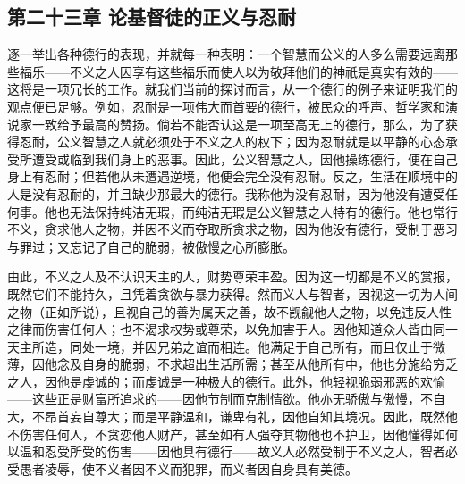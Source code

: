 \subsection{第二十三章 论基督徒的正义与忍耐}

逐一举出各种德行的表现，并就每一种表明：一个智慧而公义的人多么需要远离那些福乐——不义之人因享有这些福乐而使人以为敬拜他们的神祇是真实有效的——这将是一项冗长的工作。就我们当前的探讨而言，从一个德行的例子来证明我们的观点便已足够。例如，忍耐是一项伟大而首要的德行，被民众的呼声、哲学家和演说家一致给予最高的赞扬。倘若不能否认这是一项至高无上的德行，那么，为了获得忍耐，公义智慧之人就必须处于不义之人的权下；因为忍耐就是以平静的心态承受所遭受或临到我们身上的恶事。因此，公义智慧之人，因他操练德行，便在自己身上有忍耐；但若他从未遭遇逆境，他便会完全没有忍耐。反之，生活在顺境中的人是没有忍耐的，并且缺少那最大的德行。我称他为没有忍耐，因为他没有遭受任何事。他也无法保持纯洁无瑕，而纯洁无瑕是公义智慧之人特有的德行。他也常行不义，贪求他人之物，并因不义而夺取所贪求之物，因为他没有德行，受制于恶习与罪过；又忘记了自己的脆弱，被傲慢之心所膨胀。\par

由此，不义之人及不认识天主的人，财势尊荣丰盈。因为这一切都是不义的赏报，既然它们不能持久，且凭着贪欲与暴力获得。然而义人与智者，因视这一切为人间之物（正如所说），且视自己的善为属天之善，故不觊觎他人之物，以免违反人性之律而伤害任何人；也不渴求权势或尊荣，以免加害于人。因他知道众人皆由同一天主所造，同处一境，并因兄弟之谊而相连。他满足于自己所有，而且仅止于微薄，因他念及自身的脆弱，不求超出生活所需；甚至从他所有中，他也分施给穷乏之人，因他是虔诚的；而虔诚是一种极大的德行。此外，他轻视脆弱邪恶的欢愉——这些正是财富所追求的——因他节制而克制情欲。他亦无骄傲与傲慢，不自大，不昂首妄自尊大；而是平静温和，谦卑有礼，因他自知其境况。因此，既然他不伤害任何人，不贪恋他人财产，甚至如有人强夺其物他也不护卫，因他懂得如何以温和忍受所受的伤害——因他具有德行——故义人必然受制于不义之人，智者必受愚者凌辱，使不义者因不义而犯罪，而义者因自身具有美德。\par

